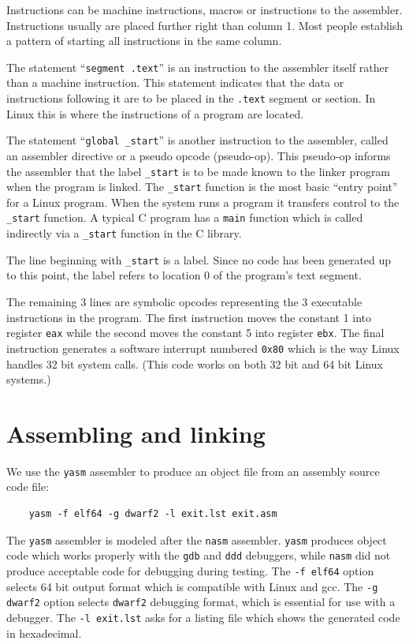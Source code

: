 \documentclass[11pt,b5paper]{book}
\begin{document}
Instructions can be machine instructions, macros or instructions to the assembler.
Instructions usually are placed further right than column 1.
Most people establish a pattern of starting all instructions in the same column.

The statement ``{\tt segment .text}''  is an instruction to the assembler itself
rather than a machine instruction.
This statement indicates that the data or instructions following it are to be
placed in the {\tt .text} segment or section.
In Linux this is where the instructions of a program are located.

The statement ``{\tt global \_start}''  is another instruction to the assembler, 
called an assembler directive or a pseudo opcode (pseudo-op). 
This pseudo-op informs the assembler that the label {\tt \_start} is to be
made known to the linker program when the program is linked.
The {\tt \_start} function is the most basic ``entry point'' for a Linux
program.
When the system runs a program it transfers control to the {\tt \_start}
function.
A typical C program has a {\tt main} function which is called indirectly via
a {\tt \_start} function in the C library.

The line beginning with {\tt  \_start} is a label.
Since no code has been generated up to this point, the label refers to location 0 of the program's
text segment.

The remaining 3 lines are symbolic opcodes representing the 3 executable
instructions in the program.
The first instruction moves the constant 1 into register {\tt eax} while the
second moves the constant 5 into register {\tt ebx}.
The final instruction generates a software interrupt numbered {\tt 0x80} which
is the way Linux handles 32 bit system calls.
(This code works on both 32 bit and 64 bit Linux systems.)

\section{Assembling and linking}

We use the {\tt yasm} assembler to produce an object file from an assembly source
code file:
\begin{verbatim}
    yasm -f elf64 -g dwarf2 -l exit.lst exit.asm
\end{verbatim}

The {\tt yasm} assembler is modeled after the {\tt nasm} assembler.  
{\tt yasm} produces object code which works properly with the {\tt gdb} and  
{\tt ddd} debuggers, while {\tt nasm} did not produce acceptable code for debugging during testing.
The {\tt -f elf64} option selects 64 bit output format which is compatible 
with Linux and gcc.
The {\tt -g dwarf2} option selects {\tt dwarf2} debugging format, which is  
essential for use with a debugger.
The {\tt -l exit.lst} asks for a listing file which shows the generated code
in hexadecimal.
\end{document}
